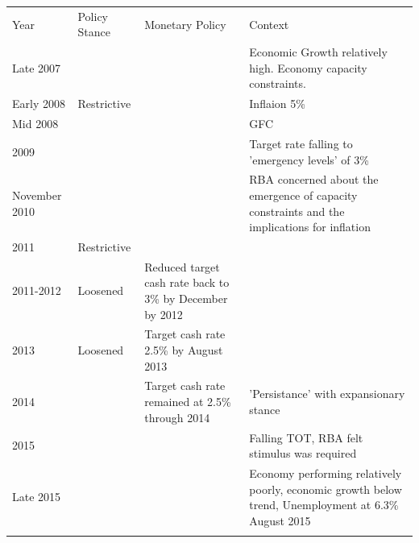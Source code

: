 \documentclass[11pt]{article}
\begin{document}
\begin{center}
\begin{tabular}{llll}
Year & Policy Stance & Monetary Policy & Context\\
Late 2007 &  &  & Economic Growth relatively high. Economy capacity constraints.\\
Early 2008 & Restrictive &  & Inflaion 5\%\\
Mid 2008 &  &  & GFC\\
2009 &  &  & Target rate falling to 'emergency levels' of 3\%\\
November 2010 &  &  & RBA concerned about the emergence of capacity constraints and the implications for inflation\\
2011 & Restrictive &  & \\
2011-2012 & Loosened & Reduced target cash rate back to 3\% by December by 2012 & \\
2013 & Loosened & Target cash rate 2.5\% by August 2013 & \\
2014 &  & Target cash rate remained at 2.5\% through 2014 & 'Persistance' with expansionary stance\\
2015 &  &  & Falling TOT, RBA felt stimulus was required\\
Late 2015 &  &  & Economy performing relatively poorly, economic growth below trend, Unemployment at 6.3\% August 2015\\
 &  &  & \\
\end{tabular}
\end{center}
\end{document}
